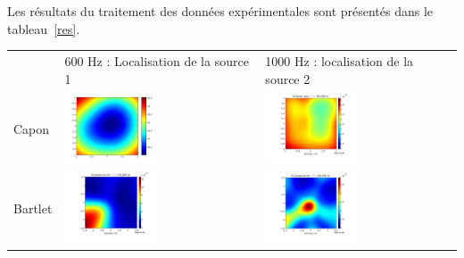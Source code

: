 \documentclass[a4paper]{article}
\begin{document}
Les résultats du traitement des données expérimentales sont présentés dans le tableau~\ref{res}.

\begin{table}[!h]
\centering
\hspace{-1cm}
\begin{tabular}{m{} m{} m{} }
 & 600 Hz : Localisation de la source 1  & 1000 Hz : localisation de la source 2 \\
	Capon & \includegraphics[width=0.5\textwidth]{capon_16h_600hz.png} &\hspace{-2cm} \includegraphics[width=0.5\textwidth]{capon_16h_1000hz.png}\\
	Bartlet & \includegraphics[width=0.5\textwidth]{bartlet_16h_600hz.png} & \hspace{-2cm}\includegraphics[width=0.5\textwidth]{bartlet_16h_1000hz.png}  \\

\end{tabular}
\end{table}
\end{document}

